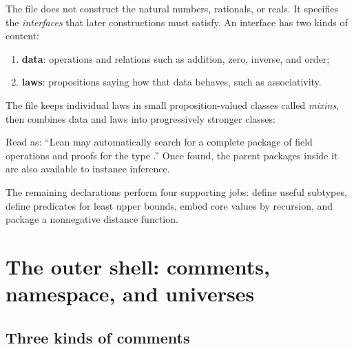 \documentclass[11pt]{article}
\newcommand{\code}[1]{\texttt{\detokenize{#1}}}
\begin{document}
The file does not construct the natural numbers, rationals, or reals. It specifies the
\emph{interfaces} that later constructions must satisfy. An interface has two kinds of
content:

\begin{enumerate}
  \item \textbf{data}: operations and relations such as addition, zero, inverse, and order;
  \item \textbf{laws}: propositions saying how that data behaves, such as associativity.
\end{enumerate}

The file keeps individual laws in small proposition-valued classes called \emph{mixins},
then combines data and laws into progressively stronger classes:

\begin{center}
\end{center}

\begin{bigidea}
Read \code{[Field F]} as: ``Lean may automatically search for a complete package of
field operations and proofs for the type \code{F}.'' Once found, the parent packages
inside it are also available to instance inference.
\end{bigidea}

The remaining declarations perform four supporting jobs: define useful subtypes,
define predicates for least upper bounds, embed core \code{Nat} values by recursion,
and package a nonnegative distance function.

\section{The outer shell: comments, namespace, and universes}

\subsection{Three kinds of comments}
\end{document}
